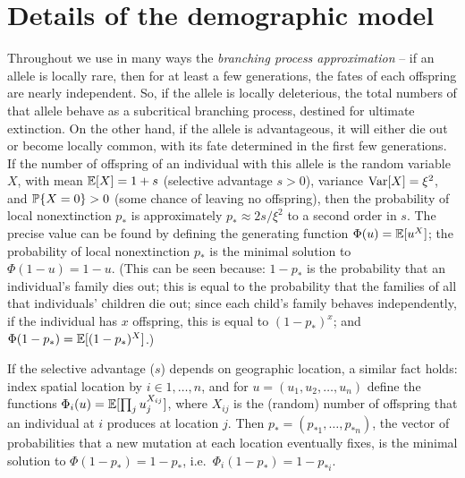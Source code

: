 
\section{Details of the demographic model}
\label{apx:demographic_model}

Throughout we use in many ways the {\em branching process approximation} --
if an allele is locally rare, then for at least a few generations,
the fates of each offspring are nearly independent.
So, if the allele is locally deleterious, the total numbers of that allele behave as a subcritical branching process,
destined for ultimate extinction.
On the other hand, if the allele is advantageous,
it will either die out or become locally common, with its fate determined in the first few generations.
If the number of offspring of an individual with this allele is the random variable $X$, 
with mean $\E[X] = 1+s$ (selective advantage $s>0$), variance $\var[X]=\xi^2$, and $\P\{X=0\}>0$ (some chance of leaving no offspring),
then the probability of local nonextinction $p_*$ is approximately $p_* \approx 2s/\xi^2$ to a second order in $s$.
The precise value can be found by defining the generating function $\Phi(u) = \E[u^X]$; 
the probability of local nonextinction $p_*$ is the minimal solution to $\Phi(1-u) = 1-u$.
(This can be seen because: $1-p_*$ is the probability that an individual's family dies out;
this is equal to the probability that the families of all that individuals' children die out;
since each child's family behaves independently, if the individual has $x$ offspring, this is equal to $(1-p_*)^x$;
and $\Phi(1-p_*) = \E[(1-p_*)^X]$.)

If the selective advantage ($s$) depends on geographic location, 
a similar fact holds: index spatial location by $i \in 1, \ldots, n$,
and for $u = (u_1,u_2,\ldots,u_n)$ define the functions $\Phi_i(u) = \E[ \prod_j u_j^{X_{ij}} ]$,
where $X_{ij}$ is the (random) number of offspring that an individual at $i$ produces at location $j$.
Then $p_* = (p_{*1}, \ldots, p_{*n})$, the vector of probabilities that a new mutation at each location eventually fixes,
is the minimal solution to $\Phi(1-p_*) = 1-p_*$,
i.e.\ $\Phi_i(1-p_*) = 1-p_{*i}$.


